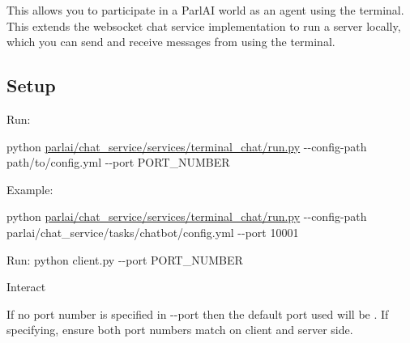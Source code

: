This allows you to participate in a Parl\+AI world as an agent using the terminal. This extends the {\ttfamily websocket} chat service implementation to run a server locally, which you can send and receive messages from using the terminal.

\subsection*{Setup}


\begin{DoxyEnumerate}
\item Run\+:

{\ttfamily python \hyperlink{parlai_2chat__service_2services_2terminal__chat_2run_8py}{parlai/chat\+\_\+service/services/terminal\+\_\+chat/run.\+py} -\/-\/config-\/path path/to/config.\+yml -\/-\/port P\+O\+R\+T\+\_\+\+N\+U\+M\+B\+ER}

Example\+:

{\ttfamily python \hyperlink{parlai_2chat__service_2services_2terminal__chat_2run_8py}{parlai/chat\+\_\+service/services/terminal\+\_\+chat/run.\+py} -\/-\/config-\/path parlai/chat\+\_\+service/tasks/chatbot/config.\+yml -\/-\/port 10001}
\item Run\+: {\ttfamily python client.\+py -\/-\/port P\+O\+R\+T\+\_\+\+N\+U\+M\+B\+ER}
\item Interact
\end{DoxyEnumerate}

If no port number is specified in {\ttfamily -\/-\/port} then the default port used will be {}. If specifying, ensure both port numbers match on client and server side. 